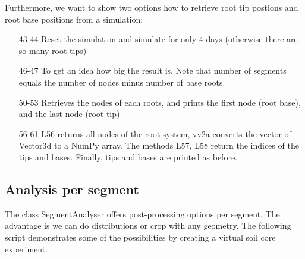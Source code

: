 \documentclass[a4paper]{article}
\begin{document}
Furthermore, we want to show two options how to retrieve root tip postions and root base positions from a simulation:



\begin{itemize}

\item[43-44] Reset the simulation and simulate for only 4 days (otherwise there are so many root tips)

\item[46-47] To get an idea how big the result is. Note that number of segments equals the number of nodes minus number of base roots.

\item[50-53] Retrieves the nodes of each roots, and prints the first node (root base), and the last node (root tip)

\item[56-61] L56 returns all nodes of the root system, vv2a converts the vector of Vector3d to a NumPy array. The methods L57, L58 return the indices of the tips and bases. Finally, tips and bases are printed as before. 

\end{itemize}



\subsection{Analysis per segment}

The class SegmentAnalyser offers post-processing options per segment. 
The advantage is we can do distributions or crop with any geometry. 
The following script demonstrates some of the possibilities by creating a virtual soil core experiment. 


\end{document}
